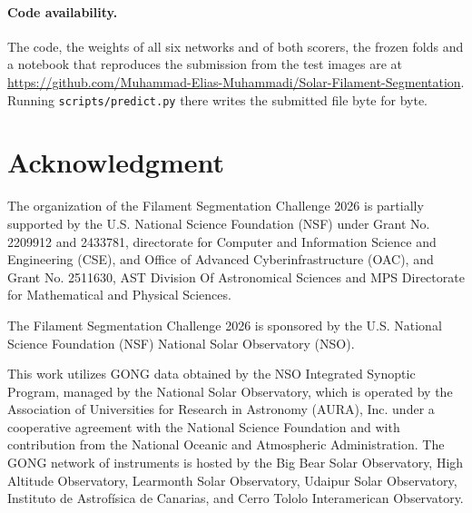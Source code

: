 \documentclass[sigconf]{acmart}
\begin{document}
\paragraph{Code availability.} The code, the weights of all six networks and of both scorers, the
frozen folds and a notebook that reproduces the submission from the test images are at
\url{https://github.com/Muhammad-Elias-Muhammadi/Solar-Filament-Segmentation}. Running
\texttt{scripts/predict.py} there writes the submitted file byte for byte.

\section{Acknowledgment}\label{sec:acknowledgment}
    The organization of the Filament Segmentation Challenge 2026 is partially supported by the U.S. National Science Foundation (NSF) under Grant No. 2209912 and 2433781, directorate for Computer and Information Science and Engineering (CSE), and Office of Advanced Cyberinfrastructure (OAC), and Grant No. 2511630, AST Division Of Astronomical Sciences and MPS Directorate for Mathematical and Physical Sciences.

    The Filament Segmentation Challenge 2026 is sponsored by the U.S. National Science Foundation (NSF) National Solar Observatory (NSO).

    This work utilizes GONG data obtained by the NSO Integrated Synoptic Program, managed by the National Solar Observatory, which is operated by the Association of Universities for Research in Astronomy (AURA), Inc. under a cooperative agreement with the National Science Foundation and with contribution from the National Oceanic and Atmospheric Administration. The GONG network of instruments is hosted by the Big Bear Solar Observatory, High Altitude Observatory, Learmonth Solar Observatory, Udaipur Solar Observatory, Instituto de Astrofísica de Canarias, and Cerro Tololo Interamerican Observatory.



\end{document}
